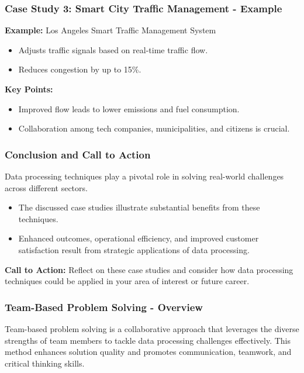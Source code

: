 \documentclass{beamer}
\begin{document}
\begin{frame}[fragile]
    \frametitle{Case Study 3: Smart City Traffic Management - Example}
    \textbf{Example:} Los Angeles Smart Traffic Management System 

    \begin{itemize}
        \item Adjusts traffic signals based on real-time traffic flow.
        \item Reduces congestion by up to 15\%.
    \end{itemize}

    \textbf{Key Points:}
    \begin{itemize}
        \item Improved flow leads to lower emissions and fuel consumption.
        \item Collaboration among tech companies, municipalities, and citizens is crucial.
    \end{itemize}
\end{frame}

\begin{frame}[fragile]
    \frametitle{Conclusion and Call to Action}
    Data processing techniques play a pivotal role in solving real-world challenges across different sectors. 

    \begin{itemize}
        \item The discussed case studies illustrate substantial benefits from these techniques.
        \item Enhanced outcomes, operational efficiency, and improved customer satisfaction result from strategic applications of data processing.
    \end{itemize}

    \textbf{Call to Action:} Reflect on these case studies and consider how data processing techniques could be applied in your area of interest or future career.
\end{frame}

\begin{frame}[fragile]
    \frametitle{Team-Based Problem Solving - Overview}
    Team-based problem solving is a collaborative approach that leverages the diverse strengths of team members to tackle data processing challenges effectively. This method enhances solution quality and promotes communication, teamwork, and critical thinking skills.
\end{frame}
\end{document}
